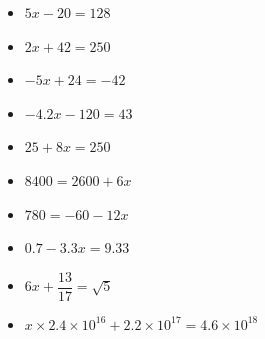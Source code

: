 \begin{multicols}{2}
\begin{itemize}[label={$\bullet$}]
\item $5x - 20 = 128$ \\ \Pointilles[10]  \columnbreak 
\item $2x + 42 = 250$ \\ \Pointilles[10]
\end{itemize} 
\end{multicols}

\begin{multicols}{2}
  \begin{itemize}[label={$\bullet$}]
\item $-5x + 24 = -42$ \\ \Pointilles[10]  \columnbreak 
\item $-4.2x - 120 = 43$ \\ \Pointilles[10]
\end{itemize} 
\end{multicols}

\begin{multicols}{2}
  \begin{itemize}[label={$\bullet$}]
\item $25 + 8x = 250 $ \\ \Pointilles[10]  \columnbreak 
\item $8400 = 2600 + 6x$ \\ \Pointilles[10]
\end{itemize} 
\end{multicols}

\begin{multicols}{2}
  \begin{itemize}[label={$\bullet$}]
\item $780 = -60 - 12x$ \\ \Pointilles[10]  \columnbreak 
\item $0.7 - 3.3x = 9.33$ \\ \Pointilles[10]
\end{itemize} 
\end{multicols}

\begin{multicols}{2}
  \begin{itemize}[label={$\bullet$}]
\item $6x + \dfrac{13}{17} = \sqrt{5}$ \\ \Pointilles[10]  \columnbreak 
\item $x \times 2.4 \times 10^{16} +  2.2 \times 10^{17} = 4.6 \times 10^{18}$ \\ \Pointilles[10]
\end{itemize} 
\end{multicols}

